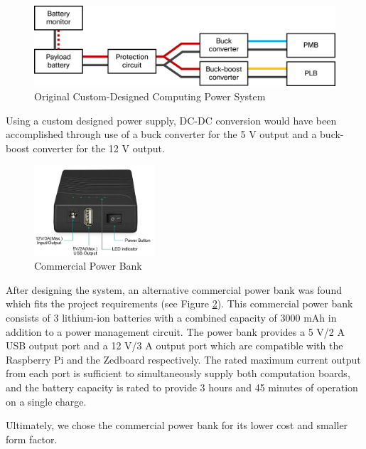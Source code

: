 \begin{figure}[H]
\centering
\includegraphics[width=13cm]{img/Power_Diagram.png}
\caption{Original Custom-Designed Computing Power System}
\label{powerdiag}
\end{figure}

Using a custom designed power supply, DC-DC conversion would have been accomplished through use of a buck converter for the 5 V output and a buck-boost converter for the 12 V output.

\begin{figure}[H]
\centering
\includegraphics[width=0.4\textwidth]{img/power_bank.png}
\caption{Commercial Power Bank}
\label{powerbank}
\end{figure}

After designing the system, an alternative commercial power bank was found which fits the project requirements (see Figure \ref{powerbank}). This commercial power bank consists of 3 lithium-ion batteries with a combined capacity of 3000 mAh in addition to a power management circuit. The power bank provides a 5 V/2 A USB output port and a 12 V/3 A output port which are compatible with the Raspberry Pi and the Zedboard respectively. The rated maximum current output from each port is sufficient to simultaneously supply both computation boards, and the battery capacity is rated to provide 3 hours and 45 minutes of operation on a single charge.

Ultimately, we chose the commercial power bank for its lower cost and smaller form factor.

